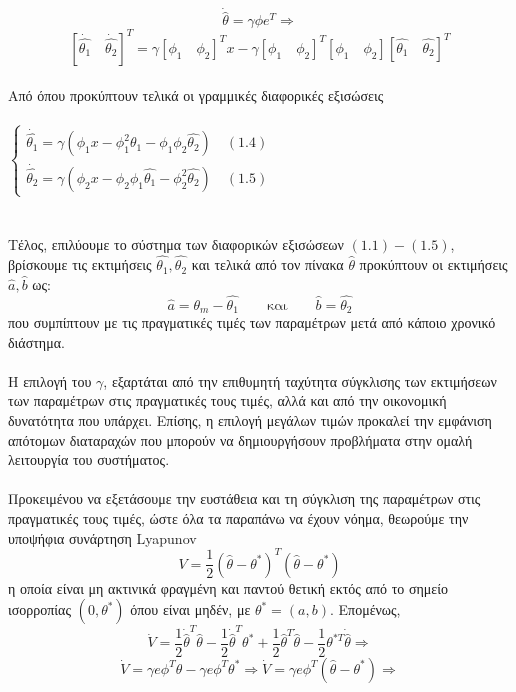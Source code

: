\documentclass[12pt]{article}
\begin{document}
\[\dot{\hat{\theta}} =\gamma \phi e^{T} \Rightarrow\]
\[ \left[ \dot{\hat{\theta_1}} \quad \dot{\hat{\theta_2}} \right]^{T}= \gamma \left[ \phi_{1} \quad \phi_{2} \right]^{T}x -\gamma \left[ \phi_{1} \quad \phi_{2} \right]^{T}\left[ \phi_{1} \quad \phi_{2} \right]\left[ \hat{\theta_1} \quad \hat{\theta_2} \right]^{T}  \]
\\
Από όπου προκύπτουν τελικά οι γραμμικές διαφορικές εξισώσεις
\\ \\
$
\left\{
\begin{array}{ll}
\dot{\hat{\theta_1}}=\gamma (\phi_{1}x-\phi_1^{2}\hat{\theta_1}-\phi_{1}\phi_{2}\hat{\theta_{2}}) \quad (1.4)
\\
\dot{\hat{\theta_2}}=\gamma (\phi_{2}x-\phi_{2}\phi_{1}\hat{\theta_1}-\phi_2^{2}\hat{\theta_{2}}) \quad(1.5)
\end{array}
\right.
$
\\ \\ \\
Τέλος, επιλύουμε το σύστημα των διαφορικών εξισώσεων $(1.1)-(1.5)$, βρίσκουμε τις εκτιμήσεις $\hat{\theta_1},\hat{\theta_2}$ και τελικά από τον πίνακα $\hat{\theta}$ προκύπτουν οι εκτιμήσεις $\hat{a},\hat{b}$ ως:
\\
\[\hat{a}=\theta_m-\hat{\theta_1} \qquad \text{και} \qquad \hat{b}=\hat{\theta_2}\]
που συμπίπτουν με τις πραγματικές τιμές των παραμέτρων μετά από κάποιο χρονικό διάστημα.
\\ \\
Η επιλογή του $\gamma$, εξαρτάται από την επιθυμητή ταχύτητα σύγκλισης των εκτιμήσεων των παραμέτρων στις πραγματικές τους τιμές, αλλά και από την οικονομική δυνατότητα που υπάρχει. Επίσης, η επιλογή μεγάλων τιμών προκαλεί την εμφάνιση απότομων διαταραχών που μπορούν να δημιουργήσουν προβλήματα στην ομαλή λειτουργία του συστήματος.
\\ \\
Προκειμένου να εξετάσουμε την ευστάθεια και τη σύγκλιση της παραμέτρων στις πραγματικές τους τιμές, ώστε όλα τα παραπάνω να έχουν νόημα, θεωρούμε την υποψήφια συνάρτηση Lyapunov
\[ V=\frac{1}{2} (\hat{\theta}-\theta^*)^T(\hat{\theta}-\theta^*) \]
η οποία είναι μη ακτινικά φραγμένη και παντού θετική εκτός από το σημείο ισορροπίας $(0,\theta^*)$ όπου είναι μηδέν, με $\theta^*=(a,b)$. Επομένως,
\[ \dot{V}= \frac{1}{2}\dot{\hat{\theta}}^T\hat{\theta}-\frac{1}{2}\dot{\hat{\theta}}^T\theta^* +\frac{1}{2}\hat{\theta}^T\dot{\hat{\theta}}-\frac{1}{2}\theta^{*T} \dot{\hat{\theta}} \Rightarrow \]
\[ \dot{V}=\gamma e \phi^T \hat{\theta}-\gamma e \phi^T \theta^* \Rightarrow \dot{V}=\gamma e \phi^T (\hat{\theta}-\theta^*)\Rightarrow\]
\end{document}
